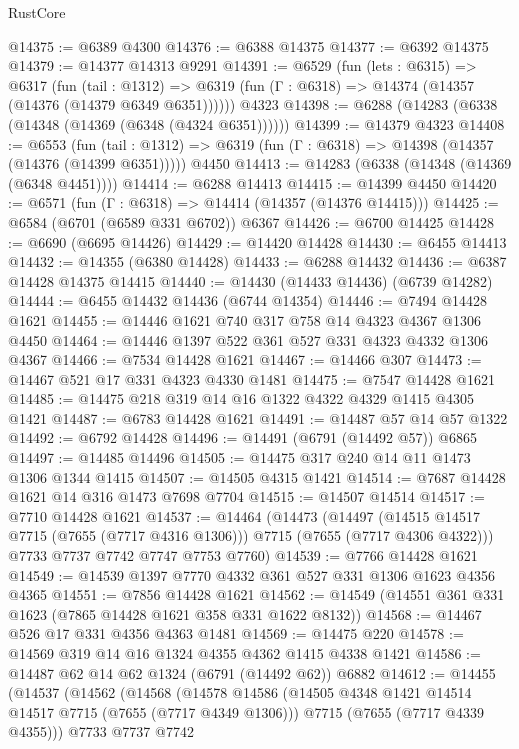 \begin{lexlean}{RustCore}
\begin{coremodule}
@14375 := @6389 @4300
@14376 := @6388 @14375
@14377 := @6392 @14375
@14379 := @14377 @14313 @9291
@14391 := @6529
    (fun (lets : @6315) =>
    @6317
      (fun (tail : @1312) =>
      @6319 (fun (Γ : @6318) => @14374 (@14357 (@14376 (@14379 @6349 @6351))))))
    @4323
@14398 := @6288 (@14283 (@6338 (@14348 (@14369 (@6348 (@4324 @6351))))))
@14399 := @14379 @4323
@14408 := @6553
    (fun (tail : @1312) => @6319 (fun (Γ : @6318) => @14398 (@14357 (@14376 (@14399 @6351)))))
    @4450
@14413 := @14283 (@6338 (@14348 (@14369 (@6348 @4451))))
@14414 := @6288 @14413
@14415 := @14399 @4450
@14420 := @6571 (fun (Γ : @6318) => @14414 (@14357 (@14376 @14415)))
@14425 := @6584 (@6701 (@6589 @331 @6702)) @6367
@14426 := @6700 @14425
@14428 := @6690 (@6695 @14426)
@14429 := @14420 @14428
@14430 := @6455 @14413
@14432 := @14355 (@6380 @14428)
@14433 := @6288 @14432
@14436 := @6387 @14428 @14375 @14415
@14440 := @14430 (@14433 @14436) (@6739 @14282)
@14444 := @6455 @14432 @14436 (@6744 @14354)
@14446 := @7494 @14428 @1621
@14455 := @14446 @1621 @740 @317 @758 @14 @4323 @4367 @1306 @4450
@14464 := @14446 @1397 @522 @361 @527 @331 @4323 @4332 @1306 @4367
@14466 := @7534 @14428 @1621
@14467 := @14466 @307
@14473 := @14467 @521 @17 @331 @4323 @4330 @1481
@14475 := @7547 @14428 @1621
@14485 := @14475 @218 @319 @14 @16 @1322 @4322 @4329 @1415 @4305 @1421
@14487 := @6783 @14428 @1621
@14491 := @14487 @57 @14 @57 @1322
@14492 := @6792 @14428
@14496 := @14491 (@6791 (@14492 @57)) @6865
@14497 := @14485 @14496
@14505 := @14475 @317 @240 @14 @11 @1473 @1306 @1344 @1415
@14507 := @14505 @4315 @1421
@14514 := @7687 @14428 @1621 @14 @316 @1473 @7698 @7704
@14515 := @14507 @14514
@14517 := @7710 @14428 @1621
@14537 := @14464
    (@14473
      (@14497 (@14515 @14517 @7715 (@7655 (@7717 @4316 @1306))) @7715 (@7655 (@7717 @4306 @4322)))
      @7733
      @7737
      @7742
      @7747
      @7753
      @7760)
@14539 := @7766 @14428 @1621
@14549 := @14539 @1397 @7770 @4332 @361 @527 @331 @1306 @1623 @4356 @4365
@14551 := @7856 @14428 @1621
@14562 := @14549 (@14551 @361 @331 @1623 (@7865 @14428 @1621 @358 @331 @1622 @8132))
@14568 := @14467 @526 @17 @331 @4356 @4363 @1481
@14569 := @14475 @220
@14578 := @14569 @319 @14 @16 @1324 @4355 @4362 @1415 @4338 @1421
@14586 := @14487 @62 @14 @62 @1324 (@6791 (@14492 @62)) @6882
@14612 := @14455
    (@14537
      (@14562
        (@14568
          (@14578
            @14586
            (@14505 @4348 @1421 @14514 @14517 @7715 (@7655 (@7717 @4349 @1306)))
            @7715
            (@7655 (@7717 @4339 @4355)))
          @7733
          @7737
          @7742

\end{coremodule}
\end{lexlean}
